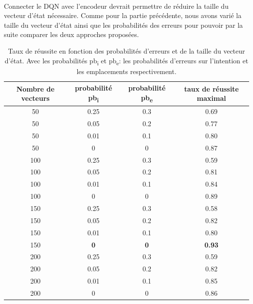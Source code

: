 \paragraph{} Connecter le DQN avec l'encodeur devrait permettre de réduire la taille du vecteur d'état nécessaire. Comme pour la partie précédente, nous avons varié la taille du vecteur d'état ainsi que les probabilités des erreurs pour pouvoir par la suite comparer les deux approches proposées. 
\begin{table}[H]
	\begin{center}
		
		\begin{tabular}{|c|c|c|c|}
			\hline
			\textbf{Nombre de vecteurs} & \textbf{probabilité pb\textsubscript{i}} & \textbf{probabilité pb\textsubscript{e}} & \textbf{taux de réussite maximal}\\
			\hline
			50 & 0.25 & 0.3 & 0.69\\
			\hline
			50 & 0.05 & 0.2 & 0.77\\
			\hline
			50 & 0.01 & 0.1 & 0.80\\
			\hline
			50 & 0 & 0 & 0.87\\
			\hline
			100 & 0.25 & 0.3 & 0.59\\
			\hline
			100 & 0.05 & 0.2 & 0.81\\
			\hline
			100 & 0.01 & 0.1 & 0.84\\
			\hline
			100 & 0 & 0 & 0.89\\
			\hline
			150 & 0.25 & 0.3 & 0.58\\
			\hline
			150 & 0.05 & 0.2 & 0.82\\
			\hline
			150 & 0.01 & 0.1 & 0.80\\
			\hline
			150 & \textbf{0} & \textbf{0} & \textbf{0.93}\\
			\hline
			200 & 0.25 & 0.3 & 0.59\\
			\hline
			200 & 0.05 & 0.2 & 0.82\\
			\hline
			\rowcolor{LightCyan}
			200 & 0.01 & 0.1 & 0.85\\
			\hline
			200 & 0 & 0 & 0.86\\
			\hline
		\end{tabular}
		\caption{Taux de réussite en fonction des probabilités d'erreurs et de la taille du vecteur d'état. Avec les probabilités pb\textsubscript{i} et pb\textsubscript{e}: les probabilités d'erreurs sur l'intention et les emplacements respectivement.}\label{table_results_con}
	\end{center}
\end{table}
